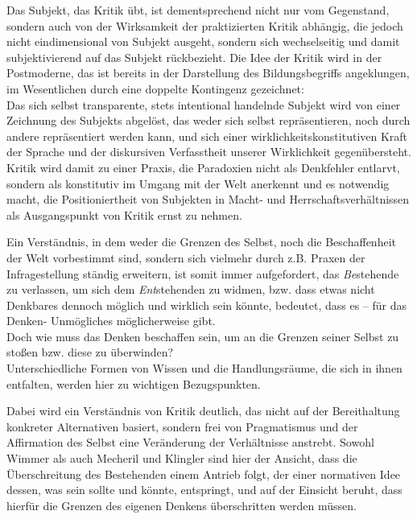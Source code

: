 Das Subjekt, das Kritik übt, ist dementsprechend nicht nur vom Gegenstand,
sondern auch von der Wirksamkeit der praktizierten Kritik abhängig, die jedoch
nicht eindimensional von Subjekt ausgeht, sondern sich wechselseitig und damit
subjektivierend auf das Subjekt rückbezieht. 
Die Idee der Kritik wird in der
Postmoderne, das ist bereits in der Darstellung des Bildungsbegriffs
angeklungen, im Wesentlichen durch eine doppelte Kontingenz gezeichnet:\\
 Das
sich selbst transparente, stets intentional handelnde Subjekt wird von einer
Zeichnung des Subjekts abgelöst, das weder sich selbst repräsentieren, noch
durch andere repräsentiert werden kann, und sich einer
\glqq wirklichkeitskonstitutiven Kraft der Sprache und der diskursiven Verfasstheit
unserer Wirklichkeit \grqq\footnotemark {} gegenübersteht. Kritik wird damit zu einer Praxis, die
Paradoxien nicht als Denkfehler entlarvt, sondern als konstitutiv im Umgang mit
der Welt  anerkennt und es notwendig macht, die Positioniertheit von Subjekten
in Macht- und Herrschaftsverhältnissen als Ausgangspunkt von Kritik ernst zu
nehmen.  

Ein Verständnis, in dem weder die Grenzen des Selbst, noch die
Beschaffenheit der Welt vorbestimmt sind, sondern sich vielmehr durch z.B.
Praxen der Infragestellung ständig erweitern, ist somit immer aufgefordert, das
\textit{Be}stehende zu verlassen, um sich dem \textit{Ent}stehenden zu widmen, bzw. \glqq dass etwas
nicht Denkbares dennoch möglich und wirklich sein könnte, bedeutet, dass es –
für das Denken- Unmögliches möglicherweise gibt.\grqq\footnotemark
{}
\\

Doch wie muss das Denken beschaffen sein, um an die Grenzen seiner Selbst zu
stoßen bzw. diese zu überwinden? \\
Unterschiedliche Formen von Wissen und die
Handlungsräume, die sich in ihnen entfalten, werden hier zu wichtigen
Bezugspunkten.  

Dabei wird ein Verständnis von Kritik deutlich, das nicht auf
der Bereithaltung konkreter Alternativen basiert, sondern frei von Pragmatismus
und der Affirmation des Selbst eine Veränderung der Verhältnisse anstrebt.
Sowohl Wimmer als auch Mecheril und Klingler sind hier der Ansicht, dass die
Überschreitung des Bestehenden einem Antrieb folgt, der einer normativen Idee
dessen, was sein sollte und könnte, entspringt, und auf der Einsicht beruht,
dass hierfür die Grenzen des eigenen Denkens überschritten werden müssen.

